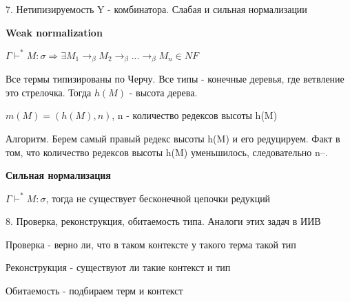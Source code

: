 \begin{para}{7. Нетипизируемость Y - комбинатора. Слабая и сильная нормализации}


\textbf{Weak normalization}

$\Gamma \vdash^* M : \sigma \Rightarrow \exists M_1 \rightarrow_\beta M_2 \rightarrow_\beta ... \rightarrow_\beta M_n \in NF$

Все термы типизированы по Черчу. Все типы - конечные деревья, где ветвление это стрелочка. Тогда $h(M)$ - высота дерева.

$m(M) = (h(M), n)$, n - количество редексов высоты h(M)

Алгоритм. Берем самый правый редекс высоты h(M) и его редуцируем. Факт в том, что количество редексов высоты h(M) уменьшилось, следовательно n--.


\textbf{Сильная нормализация}

$\Gamma \vdash^* M : \sigma$, тогда не существует бесконечной цепочки редукций

\end{para}



\begin{para}{8. Проверка, реконструкция, обитаемость типа. Аналоги этих задач в ИИВ}

Проверка - верно ли, что в таком контексте у такого терма такой тип

Реконструкция - существуют ли такие контекст и тип

Обитаемость - подбираем терм и контекст



\end{para}
